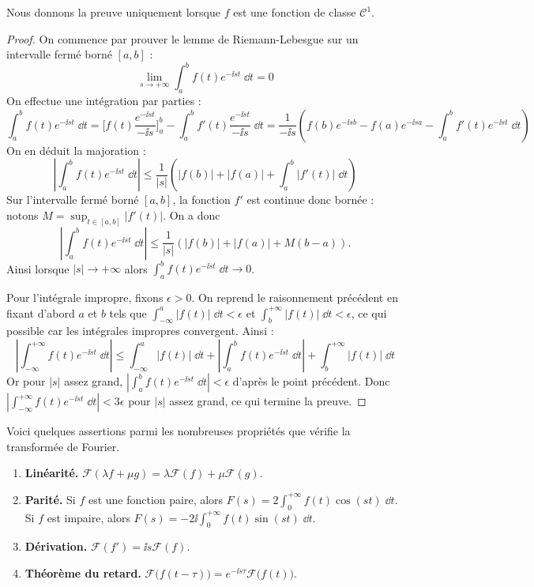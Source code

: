 \documentclass[class=report,crop=false]{standalone}
\begin{document}
Nous donnons la preuve uniquement lorsque $f$ est 
une fonction de classe $\mathcal{C}^1$.
\begin{proof}
On commence par prouver le lemme de Riemann-Lebesgue
sur un intervalle fermé borné $[a,b]$ :
$$\lim_{s\to+\infty} \int_{a}^{b} f(t) e^{-\ii st}\;\dd t = 0$$
On effectue une intégration par parties :
$$\int_{a}^{b} f(t) e^{-\ii st}\;\dd t 
= \Big[f(t)\frac{e^{-\ii st}}{-\ii s}\Big]_{a}^{b} 
- \int_{a}^{b} f'(t) \frac{e^{-\ii st}}{-\ii s}\;\dd t
= \frac{1}{-\ii s} \left( f(b) e^{-\ii sb} - f(a) e^{-\ii sa} 
- \int_{a}^{b} f'(t)e^{-\ii st}\;\dd t \right)$$
On en déduit la majoration :
$$\left| \int_{a}^{b} f(t) e^{-\ii st}\;\dd t \right|
\le \frac{1}{|s|} \left( \big|f(b)\big| + \big|f(a)\big| 
+ \int_{a}^{b} \big|f'(t)\big| \;\dd t \right)$$
Sur l'intervalle fermé borné $[a,b]$, la fonction $f'$ est continue
donc bornée : notons $M=\sup_{t\in[a,b]} \big| f'(t) \big|$.
On a donc
$$\left| \int_{a}^{b} f(t) e^{-\ii st}\;\dd t \right|
\le \frac{1}{|s|} \left( \big|f(b)\big| + \big|f(a)\big| 
+ M(b-a) \right).$$
Ainsi lorsque $|s| \to +\infty$ alors 
$\int_{a}^{b} f(t) e^{-\ii st}\;\dd t  \to 0$.

\bigskip
Pour l'intégrale impropre, fixons $\epsilon>0$. 
On reprend le raisonnement précédent en fixant
d'abord $a$ et $b$ tels que 
$\int_{-\infty}^{a} \big| f(t) \big| \;\dd t < \epsilon$
et $\int_{b}^{+\infty} \big| f(t) \big| \;\dd t < \epsilon$, ce qui 
possible car les intégrales impropres convergent.
Ainsi :
$$\left| \int_{-\infty}^{+\infty} f(t) e^{-\ii st}\;\dd t \right|
\le \int_{-\infty}^{a} \big| f(t) \big| \;\dd t
+ \left| \int_{a}^{b} f(t) e^{-\ii st}\;\dd t \right|
+ \int_{b}^{+\infty} \big| f(t) \big| \;\dd t$$
Or pour $|s|$ assez grand, $\left| \int_{a}^{b} f(t) e^{-\ii st}\;\dd t \right| < \epsilon$
d'après le point précédent.
Donc $\left| \int_{-\infty}^{+\infty} f(t) e^{-\ii st}\;\dd t \right| < 3\epsilon$
pour $|s|$ assez grand, ce qui termine la preuve.
\end{proof}

Voici quelques assertions parmi les nombreuses propriétés que 
vérifie la transformée de Fourier.
\begin{proposition}
\label{prop:fourier2}
\begin{enumerate}
  \item \textbf{Linéarité.} $\mathcal{F}(\lambda f +\mu g) = \lambda\mathcal{F}(f)+\mu \mathcal{F}(g)$.
  
  \item \textbf{Parité.} Si $f$ est une fonction paire, alors
  $F(s) = 2 \int_0^{+\infty} f(t) \cos(st) \;\dd t$. Si $f$ est impaire,
  alors $F(s) = -2\ii \int_0^{+\infty} f(t) \sin(st) \;\dd t$.
    
  \item \textbf{Dérivation.} $\mathcal{F}(f') = \ii s \mathcal{F}(f)$.
  
  \item \textbf{Théorème du retard.} $\mathcal{F}\big(f(t-\tau)\big) 
  = e^{-\ii s\tau}\mathcal{F}\big(f(t)\big)$.

\end{enumerate}  
\end{proposition}
\end{document}
